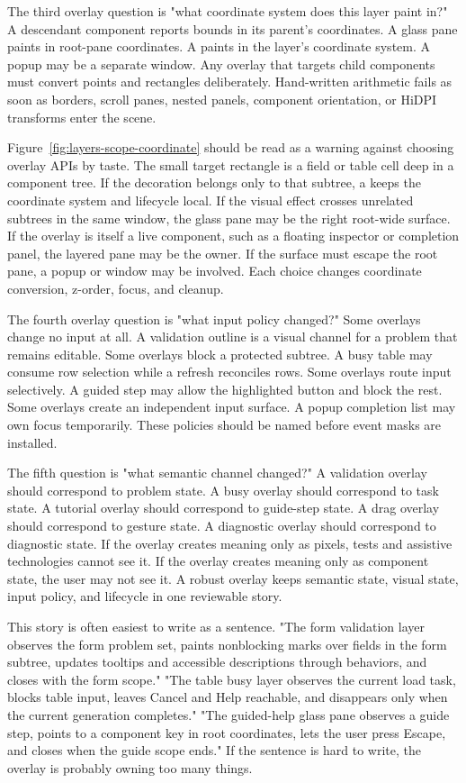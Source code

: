 The third overlay question is "what coordinate system does this layer paint in?" A descendant component reports bounds in its parent's coordinates. A glass pane paints in root-pane coordinates. A  paints in the layer's coordinate system. A popup may be a separate window. Any overlay that targets child components must convert points and rectangles deliberately. Hand-written arithmetic fails as soon as borders, scroll panes, nested panels, component orientation, or HiDPI transforms enter the scene.

Figure~\ref{fig:layers-scope-coordinate} should be read as a warning against
choosing overlay APIs by taste. The small target rectangle is a field or table
cell deep in a component tree. If the decoration belongs only to that subtree, a
 keeps the coordinate system and lifecycle local. If the visual
effect crosses unrelated subtrees in the same window, the glass pane may be the
right root-wide surface. If the overlay is itself a live component, such as a
floating inspector or completion panel, the layered pane may be the owner. If
the surface must escape the root pane, a popup or window may be involved. Each
choice changes coordinate conversion, z-order, focus, and cleanup.

The fourth overlay question is "what input policy changed?" Some overlays
change no input at all. A validation outline is a visual channel for a problem
that remains editable. Some overlays block a protected subtree. A busy table may
consume row selection while a refresh reconciles rows. Some overlays route input
selectively. A guided step may allow the highlighted button and block the rest.
Some overlays create an independent input surface. A popup completion list may
own focus temporarily. These policies should be named before event masks are
installed.

The fifth question is "what semantic channel changed?" A validation overlay
should correspond to problem state. A busy overlay should correspond to task
state. A tutorial overlay should correspond to guide-step state. A drag overlay
should correspond to gesture state. A diagnostic overlay should correspond to
diagnostic state. If the overlay creates meaning only as pixels, tests and
assistive technologies cannot see it. If the overlay creates meaning only as
component state, the user may not see it. A robust overlay keeps semantic state,
visual state, input policy, and lifecycle in one reviewable story.

This story is often easiest to write as a sentence. "The form validation layer
observes the form problem set, paints nonblocking marks over fields in the form
subtree, updates tooltips and accessible descriptions through behaviors, and
closes with the form scope." "The table busy layer observes the current load
task, blocks table input, leaves Cancel and Help reachable, and disappears only
when the current generation completes." "The guided-help glass pane observes a
guide step, points to a component key in root coordinates, lets the user press
Escape, and closes when the guide scope ends." If the sentence is hard to write,
the overlay is probably owning too many things.

